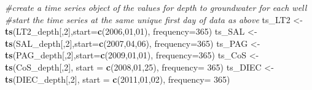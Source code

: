 \documentclass[
]{article}
\newenvironment{Shaded}{\begin{snugshade}}{\end{snugshade}}
\newcommand{\AttributeTok}[1]{\textcolor[rgb]{0.13,0.29,0.53}{#1}}
\newcommand{\CommentTok}[1]{\textcolor[rgb]{0.56,0.35,0.01}{\textit{#1}}}
\newcommand{\DecValTok}[1]{\textcolor[rgb]{0.00,0.00,0.81}{#1}}
\newcommand{\FunctionTok}[1]{\textcolor[rgb]{0.13,0.29,0.53}{\textbf{#1}}}
\newcommand{\NormalTok}[1]{#1}
\newcommand{\OtherTok}[1]{\textcolor[rgb]{0.56,0.35,0.01}{#1}}
\begin{document}
\begin{Shaded}
\begin{Highlighting}[]
\CommentTok{\#create a time series object of the values for depth to groundwater for each well}
\CommentTok{\#start the time series at the same unique first day of data as above}
\NormalTok{ts\_LT2 }\OtherTok{\textless{}{-}} \FunctionTok{ts}\NormalTok{(LT2\_depth[,}\DecValTok{2}\NormalTok{],}\AttributeTok{start=}\FunctionTok{c}\NormalTok{(}\DecValTok{2006}\NormalTok{,}\DecValTok{01}\NormalTok{,}\DecValTok{01}\NormalTok{), }\AttributeTok{frequency=}\DecValTok{365}\NormalTok{)}
\NormalTok{ts\_SAL }\OtherTok{\textless{}{-}} \FunctionTok{ts}\NormalTok{(SAL\_depth[,}\DecValTok{2}\NormalTok{],}\AttributeTok{start=}\FunctionTok{c}\NormalTok{(}\DecValTok{2007}\NormalTok{,}\DecValTok{04}\NormalTok{,}\DecValTok{06}\NormalTok{), }\AttributeTok{frequency=}\DecValTok{365}\NormalTok{)}
\NormalTok{ts\_PAG }\OtherTok{\textless{}{-}} \FunctionTok{ts}\NormalTok{(PAG\_depth[,}\DecValTok{2}\NormalTok{],}\AttributeTok{start=}\FunctionTok{c}\NormalTok{(}\DecValTok{2009}\NormalTok{,}\DecValTok{01}\NormalTok{,}\DecValTok{01}\NormalTok{), }\AttributeTok{frequency=}\DecValTok{365}\NormalTok{)}
\NormalTok{ts\_CoS }\OtherTok{\textless{}{-}} \FunctionTok{ts}\NormalTok{(CoS\_depth[,}\DecValTok{2}\NormalTok{], }\AttributeTok{start =} \FunctionTok{c}\NormalTok{(}\DecValTok{2008}\NormalTok{,}\DecValTok{01}\NormalTok{,}\DecValTok{25}\NormalTok{), }\AttributeTok{frequency=} \DecValTok{365}\NormalTok{)}
\NormalTok{ts\_DIEC }\OtherTok{\textless{}{-}} \FunctionTok{ts}\NormalTok{(DIEC\_depth[,}\DecValTok{2}\NormalTok{], }\AttributeTok{start =} \FunctionTok{c}\NormalTok{(}\DecValTok{2011}\NormalTok{,}\DecValTok{01}\NormalTok{,}\DecValTok{02}\NormalTok{), }\AttributeTok{frequency=} \DecValTok{365}\NormalTok{)}


\end{Highlighting}
\end{Shaded}
\end{document}
